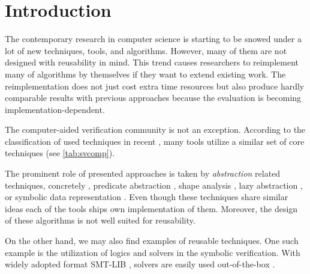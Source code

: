 \chapter{Introduction}
\label{ch:intro}


The contemporary research in computer science is starting to be snowed under a lot of new techniques, tools, and algorithms.
However, many of them are not designed with reusability in mind.
This trend causes researchers to reimplement many of algorithms by themselves if they want to extend existing work.
The reimplementation does not just cost extra time resources but also produce hardly comparable results with previous approaches because the evaluation is becoming implementation-dependent.

The computer-aided verification community is not an exception.
According to the classification of used techniques in recent \svcomp \cite{SVCOMP2019}, many tools utilize a similar set of core techniques (see \autoref{tab:svcomp}).

The prominent role of presented approaches is taken by \emph{abstraction} related techniques, concretely \cegar
\cite{Clarke20}, predicate abstraction \cite{Flanagan02}, shape analysis \cite{Yang2008}, lazy abstraction \cite{Henzinger2002}, or symbolic data representation \cite{King76,Burch1990,Majumdar2018}.
Even though these techniques share similar ideas each of the tools ships own implementation of them.
Moreover, the design of these algorithms is not well suited for reusability.


On the other hand, we may also find examples of reusable techniques.  One such
example is the utilization of \smt logics and solvers in the symbolic
verification.  With widely adopted format SMT-LIB \cite{Barrett2010}, \smt
solvers are easily used out-of-the-box \cite{Dutertre2006, DeMoura2008, Barrett2011, Corzilius2015}.



